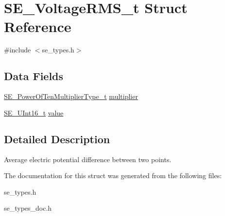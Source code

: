 \hypertarget{structSE__VoltageRMS__t}{}\section{S\+E\+\_\+\+Voltage\+R\+M\+S\+\_\+t Struct Reference}
\label{structSE__VoltageRMS__t}


{\ttfamily \#include $<$se\+\_\+types.\+h$>$}

\subsection*{Data Fields}
\begin{DoxyCompactItemize}
\item 
\hyperlink{group__PowerOfTenMultiplierType_gaf0317b781dc8dbb9cb6ac4e44a14fdef}{S\+E\+\_\+\+Power\+Of\+Ten\+Multiplier\+Type\+\_\+t} \hyperlink{group__VoltageRMS_gad05e5d9b4adf6e1b04defeeaed1f694e}{multiplier}
\item 
\hyperlink{group__UInt16_gac68d541f189538bfd30cfaa712d20d29}{S\+E\+\_\+\+U\+Int16\+\_\+t} \hyperlink{group__VoltageRMS_ga2b0cd2e5e58cc778f67c6dc0ed78f672}{value}
\end{DoxyCompactItemize}


\subsection{Detailed Description}
Average electric potential difference between two points. 

The documentation for this struct was generated from the following files\+:\begin{DoxyCompactItemize}
\item 
se\+\_\+types.\+h\item 
se\+\_\+types\+\_\+doc.\+h\end{DoxyCompactItemize}
